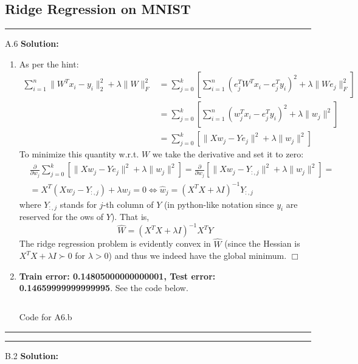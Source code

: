 \documentclass{article}
\newcommand{\1}{\mathbf{1}}
\begin{document}
\subsection*{Ridge Regression on MNIST}
\noindent\rule{\textwidth}{1pt}
A.6 {\bf Solution:}\\
\begin{enumerate}
    \item As per the hint: \begin{align*}
                \sum_{i=1}^{n} \| W^T x_i - y_i \|_2^2 + \lambda \| W \|_F^2
                &= \sum_{j=0}^{k} \left[ \sum_{i=1}^{n} (e_j^TW^Tx_i - e_j^Ty_i)^2 + \lambda \|We_j\|_F^2 \right]
                \\&= \sum_{j=0}^{k} \left[ \sum_{i=1}^{n} (w_j^Tx_i - e_j^Ty_i)^2 + \lambda \|w_j\|^2 \right]
                \\&= \sum_{j=0}^{k} \left[ \| Xw_j - Ye_j \|^2 + \lambda \|w_j\|^2 \right]
            \end{align*}
          To minimize this quantity w.r.t. $W$ we take the derivative and set it to zero:
          \begin{align*}
          &\frac{\partial}{\partial w_j} \sum_{j=0}^{k} \left[ \| Xw_j - Ye_j \|^2 + \lambda \|w_j\|^2\right] = 
          \frac{\partial}{\partial w_j} \left[ \| Xw_j - Y_{:,j} \|^2 + \lambda \|w_j\|^2\right] = \\
          &= X^T(Xw_j - Y_{:,j}) + \lambda w_j = 0 \Leftrightarrow \widehat{w}_j = (X^TX + \lambda I)^{-1}Y_{:,j}
          \end{align*}
          where $Y_{:,j}$ stands for $j$-th column of $Y$ (in python-like notation since $y_i$ are reserved for the ows of $Y$).
          That is,
          $$
          \boxed{\widehat{W} = (X^TX + \lambda I)^{-1} X^TY }
          $$
          The ridge regression problem is evidently convex in $\widehat{W}$ (since the Hessian is $X^TX + \lambda I \succ 0$ for $\lambda >0$) and thus we indeed have the global minimum. $\Box$
    \item {\bf Train error: 0.14805000000000001, Test error: 0.14659999999999995}. See the code below. 
          \inputminted{python}{code/A6_b.py}
          \caption{Code for A6.b}
          \label{listing:a6.b}
\end{enumerate}
\noindent\rule{\textwidth}{1pt}
\noindent\rule{\textwidth}{1pt}
B.2 {\bf Solution:}\\
\end{document}
